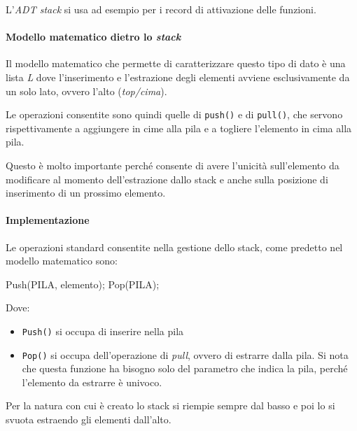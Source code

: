 \documentclass[
]{article}
\newenvironment{Shaded}{}{}
\newcommand{\NormalTok}[1]{#1}
\begin{document}
L'\emph{ADT stack} si usa ad esempio per i record di attivazione delle
funzioni.

\hypertarget{header-n1322}{%
\paragraph{\texorpdfstring{Modello matematico dietro lo
\emph{stack}}{Modello matematico dietro lo stack}}\label{header-n1322}}

Il modello matematico che permette di caratterizzare questo tipo di dato
è una lista \emph{L} dove l'inserimento e l'estrazione degli elementi
avviene esclusivamente da un solo lato, ovvero l'alto (\emph{top/cima}).

Le operazioni consentite sono quindi quelle di \texttt{push()} e di
\texttt{pull()}, che servono rispettivamente a aggiungere in cime alla
pila e a togliere l'elemento in cima alla pila.

Questo è molto importante perché consente di avere l'unicità
sull'elemento da modificare al momento dell'estrazione dallo stack e
anche sulla posizione di inserimento di un prossimo elemento.

\hypertarget{header-n1327}{%
\paragraph{Implementazione}\label{header-n1327}}

Le operazioni standard consentite nella gestione dello stack, come
predetto nel modello matematico sono:

\begin{Shaded}
\begin{Highlighting}[]
\NormalTok{Push(PILA, elemento);}
\NormalTok{Pop(PILA); }
\end{Highlighting}
\end{Shaded}

Dove:

\begin{itemize}
\item
  \texttt{Push()} si occupa di inserire nella pila
\item
  \texttt{Pop()} si occupa dell'operazione di \emph{pull}, ovvero di
  estrarre dalla pila. Si nota che questa funzione ha bisogno solo del
  parametro che indica la pila, perché l'elemento da estrarre è univoco.
\end{itemize}

Per la natura con cui è creato lo stack si riempie sempre dal basso e
poi lo si svuota estraendo gli elementi dall'alto.
\end{document}
